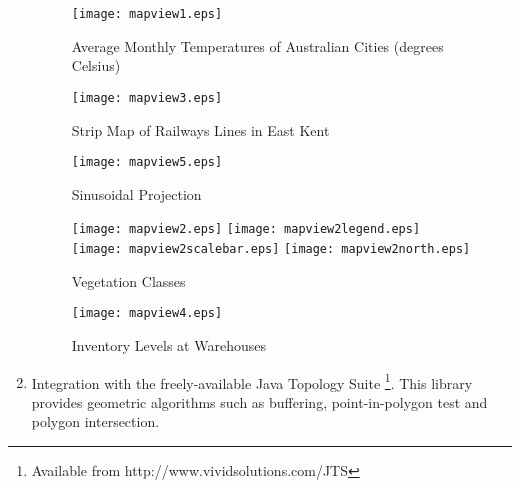 \begin{enumerate}
\begin{figure}
\texttt{[image: mapview1.eps]}
\caption[Average Monthly Temperatures]{Average Monthly Temperatures of Australian Cities (degrees Celsius)}
\label{mapview1}
\end{figure}

\begin{figure}
\texttt{[image: mapview3.eps]}
\caption{Strip Map of Railways Lines in East Kent}
\label{mapview3}
\end{figure}

\begin{figure}
\texttt{[image: mapview5.eps]}
\caption{Sinusoidal Projection}
\label{mapview5}
\end{figure}


\begin{figure}

\texttt{[image: mapview2.eps]}
\texttt{[image: mapview2legend.eps]}
\vspace{1pt}
\texttt{[image: mapview2scalebar.eps]}
\texttt{[image: mapview2north.eps]}
\caption{Vegetation Classes}
\label{mapview2}
\end{figure}

\begin{figure}
\texttt{[image: mapview4.eps]}
\caption{Inventory Levels at Warehouses}
\label{mapview4}
\end{figure}


\item
Integration with the freely-available
Java Topology Suite
\footnote{Available from http://www.vividsolutions.com/JTS}.
This library provides geometric algorithms
such as buffering, point-in-polygon test and polygon intersection.


\end{enumerate}
